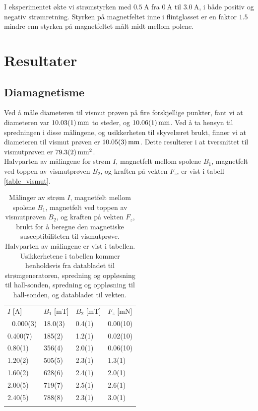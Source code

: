 \documentclass[%
 reprint,
 amsmath,amssymb,
 aps,
 norsk,
]{revtex4-1}
\begin{document}
I eksperimentet økte vi strømstyrken med $\SI{0.5}{\ampere}$ fra $\SI{0}{\ampere}$ til $\SI{3.0}{\ampere}$, i både positiv og negativ strømretning. Styrken på magnetfeltet inne i flintglasset er en faktor $1.5$ mindre enn styrken på magnetfeltet målt midt mellom polene.
\section{\label{sec:level4}Resultater}
\subsection{Diamagnetisme}
Ved å måle diameteren til vismut prøven på fire forskjellige punkter, fant vi at diameteren var $\SI{10.03\pm0.01}{\milli\meter}$ to steder, og $\SI{10.06\pm0.01}{\milli\meter}$. Ved å ta hensyn til spredningen i disse målingene, og usikkerheten til skyvelæret brukt, finner vi at diameteren til vismut prøven er $\SI{10.05\pm0.03}{\milli\meter}$. Dette resulterer i at tversnittet til vismutprøven er $\SI{79.3\pm0.2}{\milli\meter^2}$.\\
Halvparten av målingene for strøm $I$, magnetfelt mellom spolene $B_1$, magnetfelt ved toppen av vismutprøven $B_2$, og kraften på vekten $F_z$, er vist i tabell \vref{table_vismut}.
\begin{table}
  \centering
  \caption{Målinger av strøm $I$, magnetfelt mellom spolene $B_1$, magnetfelt ved toppen av vismutprøven $B_2$, og kraften på vekten $F_z$, brukt for å beregne den magnetiske susceptibiliteten til vismutprøve. Halvparten av målingene er vist i tabellen. Usikkerhetene i tabellen kommer henholdsvis fra databladet til strømgeneratoren, spredning og oppløsning til hall-sonden, spredning og oppløsning til hall-sonden, og databladet til vekten.}
  \label{table_vismut}
    \begin{tabular}{@{}llll@{}}\botrule
    $I$ {[}A{]} & $B_1$ {[}mT{]} & $B_2$ {[}mT{]} & $F_z$ {[}mN{]} \\ \colrule 
    0.000(3)    & 18.0(3)        & 0.4(1)         & 0.00(10)      \\
    0.400(7)    & 185(2)         & 1.2(1)         & 0.02(10)      \\
    0.80(1)     & 356(4)         & 2.0(1)         & 0.06(10)      \\
    1.20(2)     & 505(5)         & 2.3(1)         & 1.3(1)        \\
    1.60(2)     & 628(6)         & 2.4(1)         & 2.0(1)        \\
    2.00(5)     & 719(7)         & 2.5(1)         & 2.6(1)        \\
    2.40(5)     & 788(8)         & 2.3(1)         & 3.0(1)        \\\botrule
    \end{tabular}
\end{table}
\end{document}
